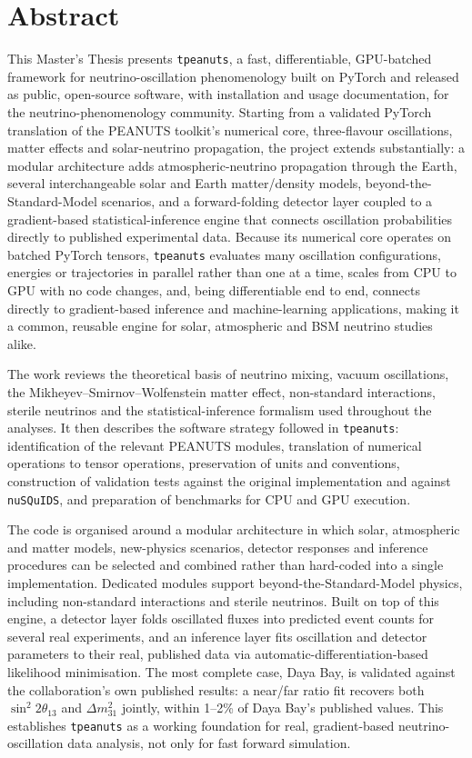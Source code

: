 \section*{Abstract}

This Master's Thesis presents \texttt{tpeanuts}, a fast, differentiable, GPU-batched framework for neutrino-oscillation phenomenology built on PyTorch and released as public, open-source software, with installation and usage documentation, for the neutrino-phenomenology community. Starting from a validated PyTorch translation of the PEANUTS toolkit's numerical core, three-flavour oscillations, matter effects and solar-neutrino propagation, the project extends substantially: a modular architecture adds atmospheric-neutrino propagation through the Earth, several interchangeable solar and Earth matter/density models, beyond-the-Standard-Model scenarios, and a forward-folding detector layer coupled to a gradient-based statistical-inference engine that connects oscillation probabilities directly to published experimental data. Because its numerical core operates on batched PyTorch tensors, \texttt{tpeanuts} evaluates many oscillation configurations, energies or trajectories in parallel rather than one at a time, scales from CPU to GPU with no code changes, and, being differentiable end to end, connects directly to gradient-based inference and machine-learning applications, making it a common, reusable engine for solar, atmospheric and BSM neutrino studies alike.

The work reviews the theoretical basis of neutrino mixing, vacuum oscillations, the Mikheyev--Smirnov--Wolfenstein matter effect, non-standard interactions, sterile neutrinos and the statistical-inference formalism used throughout the analyses. It then describes the software strategy followed in \texttt{tpeanuts}: identification of the relevant PEANUTS modules, translation of numerical operations to tensor operations, preservation of units and conventions, construction of validation tests against the original implementation and against \texttt{nuSQuIDS}, and preparation of benchmarks for CPU and GPU execution.

The code is organised around a modular architecture in which solar, atmospheric and matter models, new-physics scenarios, detector responses and inference procedures can be selected and combined rather than hard-coded into a single implementation. Dedicated modules support beyond-the-Standard-Model physics, including non-standard interactions and sterile neutrinos. Built on top of this engine, a detector layer folds oscillated fluxes into predicted event counts for several real experiments, and an inference layer fits oscillation and detector parameters to their real, published data via automatic-differentiation-based likelihood minimisation. The most complete case, Daya Bay, is validated against the collaboration's own published results: a near/far ratio fit recovers both $\sin^2 2\theta_{13}$ and $\Delta m^2_{31}$ jointly, within 1--2\% of Daya Bay's published values. This establishes \texttt{tpeanuts} as a working foundation for real, gradient-based neutrino-oscillation data analysis, not only for fast forward simulation.

